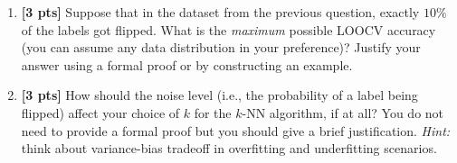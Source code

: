 \begin{enumerate}
        \begin{tcolorbox}[fit,height=5cm, width=0.9\textwidth, blank,       borderline={1pt}{-2pt}]
        \end{tcolorbox}


        \item \textbf{[3 pts]} Suppose that in the dataset from the previous question, exactly $10 \%$ of the labels got flipped. What is the \emph{maximum} possible LOOCV accuracy (you can assume any data distribution in your preference)? Justify your answer using a formal proof or by constructing an example. 

        \begin{tcolorbox}[fit,height=3cm, width=0.9\textwidth, blank,       borderline={1pt}{-2pt}]
        \end{tcolorbox}

    
        \item \textbf{[3 pts]} How should the noise level (i.e., the probability of a label being flipped) affect your choice of $k$ for the $k$-NN algorithm, if at all? You do not need to provide a formal proof but you should give a brief justification. \emph{Hint:} think about variance-bias tradeoff in overfitting and underfitting scenarios.  

        \begin{tcolorbox}[fit,height=3cm, width=0.9\textwidth, blank,       borderline={1pt}{-2pt}]
        \end{tcolorbox}


    \clearpage
\end{enumerate}